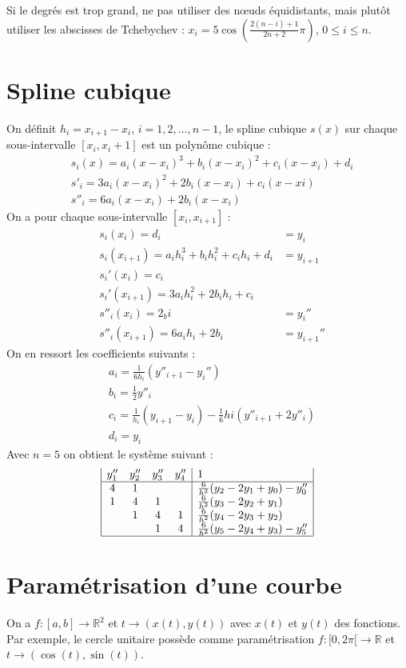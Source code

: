 \documentclass[a4paper,9pt]{extarticle}
\begin{document}
Si le degrés est trop grand, ne pas utiliser des nœuds équidistants, mais plutôt utiliser les abscisses de Tchebychev : $x_i=5\cos(\frac{2(n-i)+1}{2n+2}\pi)$, $0\leq i\leq n$.

\section{Spline cubique}

On définit $h_i=x_{i+1}-x_i$, $i=1,2,...,n-1$, le spline cubique $s(x)$ sur chaque sous-intervalle $[x_i,x_i+1]$ est un polynôme cubique :
\begin{align*}
& s_i(x)=a_i(x-x_i)^3+b_i(x-x_i)^2+c_i(x-x_i)+d_i \\
& s'_i=3a_i(x-x_i)^2+2b_i(x-x_i)+c_i(x-xi) \\
& s''_i=6a_i(x-x_i)+2b_i(x-x_i)
\end{align*}
On a pour chaque sous-intervalle $[x_i,x_{i+1}]$ :
\begin{align*}
& s_i(x_i) = d_i &= y_i\\
& s_i(x_{i+1}) = a_ih_i^3+b_ih_i^2+c_ih_i+d_i &= y_{i+1}\\
& s_i'(x_i) = c_i\\
& s_i'(x_{i+1}) = 3a_ih_i^2+2b_ih_i+c_i \\
& s''_i(x_i) = 2_bi &=y_i''\\
& s''_i(x_{i+1}) = 6a_ih_i+2b_i &= y_{i+1}''
\end{align*}
On en ressort les coefficients suivants :
\begin{align*}
& a_i = \frac{1}{6h_i}(y''_{i+1}-y_i'')\\
& b_i = \frac{1}{2}y''_i\\
& c_i = \frac{1}{h_i}(y_{i+1}-y_i)-\frac{1}{6}hi(y''_{i+1}+2y''_i)\\
& d_i = y_i
\end{align*}
Avec $n=5$ on obtient le système suivant :
$$
\begin{array}{|cccc|l|}
y_1'' & y_2'' & y_3'' & y_4'' & 1 \\
\hline
4 & 1 &   &   & \frac{6}{h^2}(y_2-2y_1+y_0)-y''_0 \\
1 & 4 & 1 &   & \frac{6}{h^2}(y_3-2y_2+y_1) \\
  & 1 & 4 & 1 & \frac{6}{h^2}(y_4-2y_3+y_2) \\
  &   & 1 & 4 & \frac{6}{h^2}(y_5-2y_4+y_3)-y''_5 \\ \hline
\end{array}
$$

\section{Paramétrisation d'une courbe}
On a $f:[a,b] \rightarrow \mathbb{R}^2$ et $t \rightarrow (x(t),y(t))$ avec $x(t)$ et $y(t)$ des fonctions. Par exemple, le cercle unitaire possède comme paramétrisation $f:[0,2\pi[ \rightarrow \mathbb{R}$ et $t\rightarrow (\cos(t),\sin(t))$.
\end{document}

